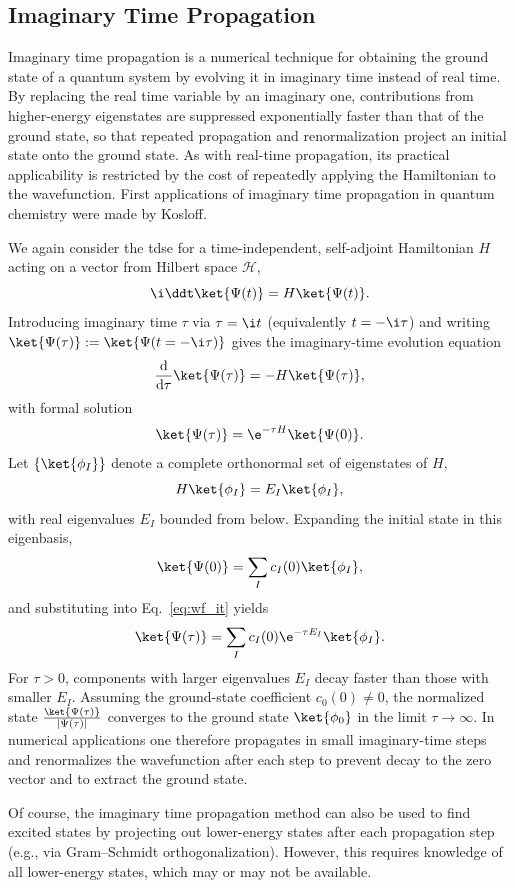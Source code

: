 \subsection{Imaginary Time Propagation}\label{sec:imaginary_time_propagation}
Imaginary time propagation is a numerical technique for obtaining the ground state of a quantum system by evolving it in imaginary time instead of real time. By replacing the real time variable by an imaginary one, contributions from higher-energy eigenstates are suppressed exponentially faster than that of the ground state, so that repeated propagation and renormalization project an initial state onto the ground state. As with real-time propagation, its practical applicability is restricted by the cost of repeatedly applying the Hamiltonian to the wavefunction. First applications of imaginary time propagation in quantum chemistry were made by Kosloff.\supercite{10.1021/j100319a003}

We again consider the \acrshort{tdse} for a time-independent, self-adjoint Hamiltonian
$H$ acting on a vector from Hilbert space $\mathcal{H}$,
\begin{equation}\label{eq:tdse_it_real}
\i\ddt\ket{\Psi(t)}=H\ket{\Psi(t)}.
\end{equation}
Introducing imaginary time $\tau$ via $\tau=\i t$ (equivalently $t=-\i\tau$) and writing
$\ket{\Psi(\tau)}:=\ket{\Psi(t=-\i\tau)}$ gives the imaginary-time evolution equation
\begin{equation}\label{eq:tdse_it}
\frac{\mathrm{d}}{\mathrm{d}\tau}\ket{\Psi(\tau)}=-H\ket{\Psi(\tau)},
\end{equation}
with formal solution
\begin{equation}\label{eq:wf_it}
\ket{\Psi(\tau)}=\e^{-\tau H}\ket{\Psi(0)}.
\end{equation}
Let $\{\ket{\phi_I}\}$ denote a complete orthonormal set of eigenstates of $H$,
\begin{equation}
H\ket{\phi_I}=E_I\ket{\phi_I},
\end{equation}
with real eigenvalues $E_I$ bounded from below. Expanding the initial state in this eigenbasis,
\begin{equation}\label{eq:wf_expansion_eigenstates}
\ket{\Psi(0)}=\sum_I c_I(0)\ket{\phi_I},
\end{equation}
and substituting into Eq.~\eqref{eq:wf_it} yields
\begin{equation}\label{eq:tdse_it_expansion}
\ket{\Psi(\tau)}=\sum_I c_I(0)\e^{-\tau E_I}\ket{\phi_I}.
\end{equation}
For $\tau>0$, components with larger eigenvalues $E_I$ decay faster than those with smaller $E_I$. Assuming the ground-state coefficient $c_0(0)\neq 0$, the normalized state $\frac{\ket{\Psi(\tau)}}{\lvert\Psi(\tau)\rvert}$ converges to the ground state $\ket{\phi_0}$ in the limit $\tau\to\infty$. In numerical applications one therefore propagates in small imaginary-time steps and renormalizes the wavefunction after each step to prevent decay to the zero vector and to extract the ground state.

Of course, the imaginary time propagation method can also be used to find excited states by projecting out lower-energy states after each propagation step (e.g., via Gram--Schmidt orthogonalization). However, this requires knowledge of all lower-energy states, which may or may not be available.
